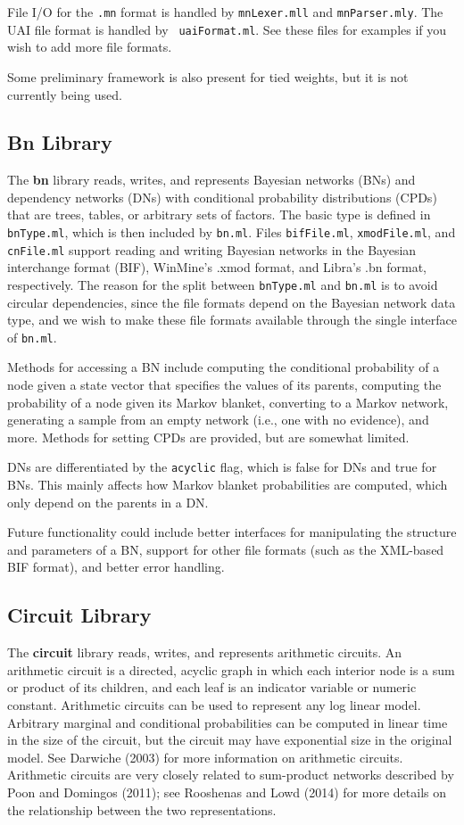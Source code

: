 \documentclass[11pt]{article}
\begin{document}
File I/O for the {\tt .mn} format is handled by {\tt mnLexer.mll} and
{\tt mnParser.mly}.  The UAI file format is handled by {\tt
uaiFormat.ml}.  See these files for examples if you wish to add more
file formats. 

Some preliminary framework is also present for tied weights, but it is
not currently being used.

\subsection{Bn Library}

The {\bf bn} library reads, writes, and represents Bayesian networks
(BNs) and dependency networks (DNs) with conditional probability
distributions (CPDs) that are trees, tables, or arbitrary sets of
factors.  The basic type is defined in {\tt bnType.ml}, which is then
included by {\tt bn.ml}.  Files {\tt bifFile.ml}, {\tt xmodFile.ml},
and {\tt cnFile.ml} support reading and writing Bayesian networks in
the Bayesian interchange format (BIF), WinMine's .xmod format, and
Libra's .bn format, respectively.  The reason for the split between
{\tt bnType.ml} and {\tt bn.ml} is to avoid circular dependencies,
since the file formats depend on the Bayesian network data type, and
we wish to make these file formats available through the single
interface of {\tt bn.ml}.

Methods for accessing a BN include computing the conditional
probability of a node given a state vector that specifies the values
of its parents, computing the probability of a node given its Markov
blanket, converting to a Markov network, generating a sample from an
empty network (i.e., one with no evidence), and more.  Methods for
setting CPDs are provided, but are somewhat limited.  

DNs are differentiated by the {\tt acyclic} flag, which is false for
DNs and true for BNs.  This mainly affects how Markov blanket
probabilities are computed, which only depend on the parents in a DN.

Future functionality could include better interfaces for manipulating
the structure and parameters of a BN, support for other file formats
(such as the XML-based BIF format), and better error handling.

\subsection{Circuit Library}

The {\bf circuit} library reads, writes, and represents arithmetic
circuits.  An arithmetic circuit is a directed, acyclic graph in which
each interior node is a sum or product of its children, and each leaf
is an indicator variable or numeric constant.  Arithmetic circuits can
be used to represent any log linear model.  Arbitrary marginal and
conditional probabilities can be computed in linear time in the size
of the circuit, but the circuit may have exponential size in the
original model.  See Darwiche (2003) for more information on
arithmetic circuits.  Arithmetic circuits are very closely related to
sum-product networks described by Poon and Domingos (2011);
see Rooshenas and Lowd (2014) for more details on the relationship
between the two representations.
\end{document}
